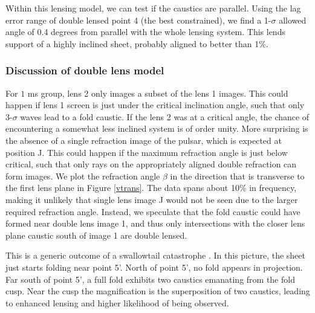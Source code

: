\documentclass[useAMS,usenatbib]{mn2e}
\begin{document}
Within this lensing model, we can test if the 
caustics are parallel.  Using the lag error range of double lensed point 4 (the best
constrained), we find a 1-$\sigma$ allowed angle of 0.4 degrees from
parallel with the whole lensing system.  This lends support of a
highly inclined sheet, probably aligned to better than 1\%.


\subsubsection{Discussion of double lens model}
\label{subsec:doublelens}
For $1$ ms group, lens 2
only images a subset of the lens 1 images.  This could happen if
lens 1 screen is just under the critical inclination
angle, such that only 3-$\sigma$ waves lead to a fold caustic.  If the lens 2 was at a critical angle, the chance of encountering a
somewhat less inclined system is of order unity.
More surprising is the absence of a single refraction
image of the pulsar, which is expected at position J.  This could
happen if the maximum refraction angle is just below critical, such
that only rays on the appropriately aligned double refraction can form
images.  
We plot the refraction angle $\beta$ in the
direction that is transverse to the first lens plane in Figure
\ref{vtrans}. The data
spans about 10\% in frequency, making it unlikely that single lens
image J would not be seen due to the larger required refraction
angle.  Instead, we speculate that the fold caustic could have formed
near double lens image 1, and thus only intersections with the closer
lens plane caustic south of image 1 are double lensed.

This is a generic outcome of a swallowtail
catastrophe \citep{Arnold1990}. In this picture, the sheet just
starts folding near point 5'.  North of point 5', no fold appears in
projection.  Far south of point 5', a full fold exhibits two caustics
emanating from the fold cusp.  Near the cusp the magnification is the
superposition of two caustics, leading to enhanced lensing and higher
likelihood of being observed.  
\end{document}

